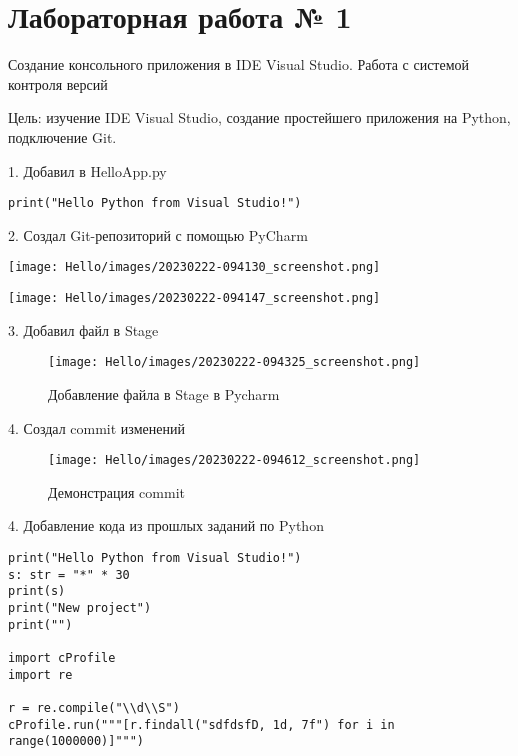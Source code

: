 \documentclass[a4paper,14pt]{extarticle}
\begin{document}
\tableofcontents \clearpage
\linespread{1.25}

\section{Лабораторная работа № 1}
\label{sec:org7c47a5d}

Создание консольного приложения в IDE Visual Studio. Работа с системой контроля версий

Цель: изучение IDE Visual Studio, создание простейшего приложения на Python, подключение Git.


​1. Добавил в HelloApp.py

\begin{verbatim}
print("Hello Python from Visual Studio!")
\end{verbatim}

​2. Создал Git-репозиторий с помощью PyCharm

\begin{center}
\texttt{[image: Hello/images/20230222-094130\_screenshot.png]}
\end{center}


\begin{center}
\texttt{[image: Hello/images/20230222-094147\_screenshot.png]}
\end{center}

​3. Добавил файл в Stage

\begin{figure}[htbp]
\centering
\texttt{[image: Hello/images/20230222-094325\_screenshot.png]}
\caption{Добавление файла в Stage в Pycharm}
\end{figure}

​4. Создал commit изменений

\begin{figure}[htbp]
\centering
\texttt{[image: Hello/images/20230222-094612\_screenshot.png]}
\caption{Демонстрация commit}
\end{figure}

\clearpage

​4. Добавление кода из прошлых заданий по Python

\begin{verbatim}
print("Hello Python from Visual Studio!")
s: str = "*" * 30
print(s)
print("New project")
print("")

import cProfile
import re

r = re.compile("\\d\\S")
cProfile.run("""[r.findall("sdfdsfD, 1d, 7f") for i in range(1000000)]""")

\end{verbatim}
\end{document}
